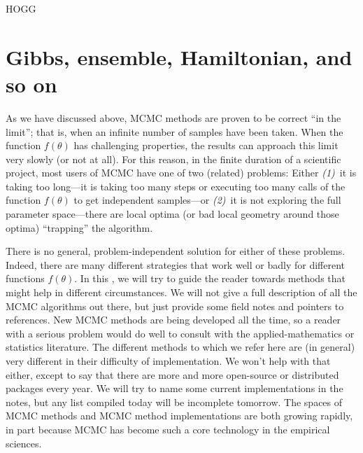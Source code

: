 \documentclass[12pt,twoside,pdftex]{article}
\newcommand{\pars}{\theta}
\begin{document}
\begin{problem}
HOGG
\end{problem}

\section{Gibbs, ensemble, Hamiltonian, and so on}\label{sec:methods}

As we have discussed above, MCMC methods are proven to be correct ``in the limit''; that is, when
an infinite number of samples have been taken.
When the function $f(\pars)$ has challenging properties, the results
can approach this limit very slowly (or not at all).
For this reason, in the finite duration of a scientific project, most
users of MCMC have one of two (related) problems:
Either \textsl{(1)}~it is taking too long---it is taking too many steps or
executing too many calls of the function $f(\pars)$ to get independent
samples---or \textsl{(2)}~it is not
exploring the full parameter space---there are local optima (or bad
local geometry around those optima) ``trapping'' the algorithm.

There is no general, problem-independent solution for either of these
problems.
Indeed, there are many different strategies that work well or badly
for different functions $f(\pars)$.
In this \sectionname, we will try to guide the reader towards methods
that might help in different circumstances.
We will not give a full description of all the MCMC algorithms out
there, but just provide some field notes and pointers to references.
New MCMC methods are being developed all the time, so a reader with a
serious problem would do well to consult with the applied-mathematics
or statistics literature.
The different methods to which we refer here are (in general) very
different in their difficulty of implementation.
We won't help with that either, except to say that there are more and
more open-source or distributed packages every year.
We will try to name some current implementations in the notes, but any
list compiled today will be incomplete tomorrow.
The spaces of MCMC methods and MCMC method implementations are both
growing rapidly, in part because MCMC has become such a core
technology in the empirical sciences.
\end{document}
